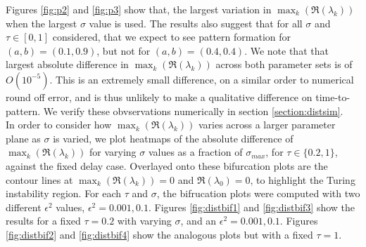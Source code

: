 Figures \ref{fig:p2} and \ref{fig:p3} show that, the largest variation in $\max_k(\Re(\lambda_k))$ when the largest $\sigma$ value is used. The results also suggest that for all $\sigma$ and $\tau\in[0,1]$ considered, that we expect to see pattern formation for $(a,b)=(0.1,0.9)$, but not for $(a,b)=(0.4,0.4)$. We note that that largest absolute difference in $\max_k(\Re(\lambda_k))$ across both parameter sets is of $O(10^{-5})$. This is an extremely small difference, on a similar order to numerical round off error, and is thus unlikely to make a qualitative difference on time-to-pattern. We verify these obvservations numerically in section \ref{section:distsim}.
\\
 In order to consider how $\max_k(\Re(\lambda_k))$ varies across a larger parameter plane as $\sigma$ is varied, we plot heatmaps of the absolute difference of $\max_k(\Re(\lambda_k))$ for varying $\sigma$ values as a fraction of $\sigma_{max}$, for $\tau\in\{0.2,1\}$, against the fixed delay case. Overlayed onto these bifurcation plots are the contour lines at $\max_k(\Re(\lambda_k))=0$ and $\Re(\lambda_0)=0$, to highlight the Turing instability region. For each $\tau$ and $\sigma$, the bifrucation plots were computed with two different $\epsilon^2$ values, $\epsilon^2=0.001,0.1$. Figures \ref{fig:distbif1} and \ref{fig:distbif3} show the results for a fixed $\tau=0.2$ with varying $\sigma$, and an $\epsilon^2=0.001,0.1$. Figures \ref{fig:distbif2} and \ref{fig:distbif4} show the analogous plots but with a fixed $\tau=1$.

